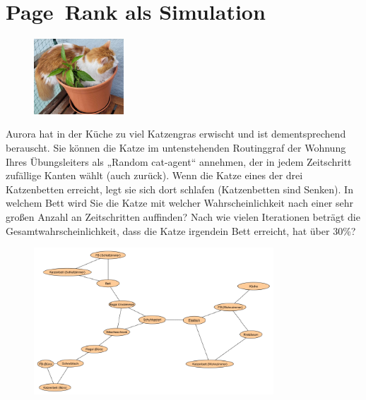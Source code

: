 \documentclass[a4paper,11pt]{report}
\begin{document}
    \newpage

    \chapter[Page Rank als Simulation]{Page~Rank als Simulation}
    \label{ch:pageRankSim}

    \begin{figure}
        \centering
        \includegraphics[width=0.3\textwidth]{a07a_cat}
        \label{fig:a06_cat}
    \end{figure}

    Aurora hat in der Küche zu viel Katzengras erwischt und ist dementsprechend berauscht.
    Sie können die Katze im untenstehenden Routinggraf der Wohnung Ihres Übungsleiters als „Random cat-agent“ annehmen,
    der in jedem Zeitschritt zufällige Kanten wählt (auch zurück).
    Wenn die Katze eines der drei Katzenbetten erreicht, legt sie sich dort schlafen (Katzenbetten sind Senken).
    In welchem Bett wird Sie die Katze mit welcher Wahrscheinlichkeit nach einer sehr großen Anzahl an Zeitschritten auffinden?
    Nach wie vielen Iterationen beträgt die Gesamtwahrscheinlichkeit, dass die Katze irgendein Bett erreicht, hat über 30\%?

    \begin{figure}[h]
        \centering
        \includegraphics[width=0.8\textwidth]{a07a_graph}
        \label{fig:a07_graph}
    \end{figure}


    \newpage
\end{document}
